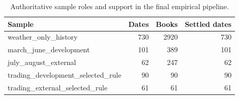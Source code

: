 \begin{table}[htbp]
\centering
\caption{Authoritative sample roles and support in the final empirical pipeline.}
\label{tab:final-sample-sizes}
\begin{tabular}{lrrr}
\toprule
Sample & Dates & Books & Settled dates \\
\midrule
weather\_only\_history & 730 & 2920 & 730 \\
march\_june\_development & 101 & 389 & 101 \\
july\_august\_external & 62 & 247 & 62 \\
trading\_development\_selected\_rule & 90 & 90 & 90 \\
trading\_external\_selected\_rule & 61 & 61 & 61 \\
\bottomrule
\end{tabular}
\end{table}
